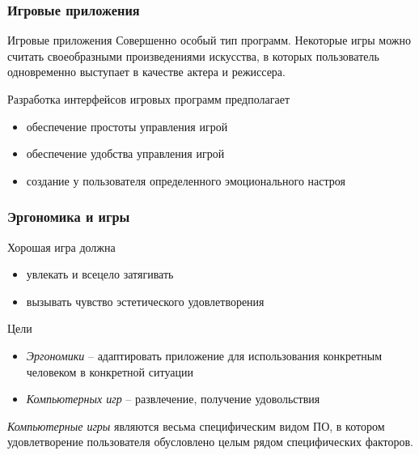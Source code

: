 \documentclass[10pt]{beamer}
\begin{document}
\begin{frame}
\frametitle{Игровые приложения}

\begin{block}{Игровые приложения}
  Совершенно особый тип программ. Некоторые игры можно считать своеобразными произведениями искусства, в которых пользователь одновременно выступает в качестве актера и режиссера.
\end{block}

\begin{block}{Разработка интерфейсов игровых программ предполагает}
  \begin{itemize}
    \item обеспечение простоты управления игрой
    \item обеспечение удобства управления игрой
    \item создание у пользователя определенного эмоционального настроя
  \end{itemize}
\end{block}
\end{frame}

\begin{frame}
\frametitle{Эргономика и игры}

\begin{block}{Хорошая игра должна}
  \begin{itemize}
    \item увлекать и всецело затягивать
    \item вызывать чувство эстетического удовлетворения
  \end{itemize}
\end{block}

\begin{block}{Цели}
  \begin{itemize}
    \item \textit{Эргономики} -- адаптировать приложение для использования конкретным человеком в конкретной ситуации
    \item \textit{Компьютерных игр} -- развлечение, получение удовольствия
  \end{itemize}
\end{block}

\begin{block}{}
  \textit{Компьютерные игры} являются весьма специфическим видом ПО, в котором удовлетворение пользователя обусловлено целым рядом специфических факторов.
\end{block}

\end{frame}
\end{document}
